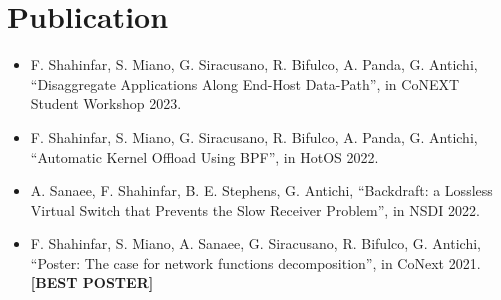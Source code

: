 \section {Publication}
\begin{itemize}
  \item F. Shahinfar, S. Miano, G. Siracusano, R. Bifulco, A. Panda, G. Antichi, ``Disaggregate Applications Along End-Host Data-Path'', in CoNEXT Student Workshop 2023.
    \item F. Shahinfar, S. Miano, G. Siracusano, R. Bifulco, A. Panda, G. Antichi, ``Automatic Kernel Offload Using BPF'', in HotOS 2022.
    \item A. Sanaee, F. Shahinfar, B. E. Stephens, G. Antichi, ``Backdraft: a Lossless Virtual Switch that
        Prevents the Slow Receiver Problem'', in NSDI 2022.

    \item F. Shahinfar, S. Miano, A. Sanaee, G. Siracusano, R. Bifulco, G. Antichi,
        ``Poster: The case for network functions decomposition'', in CoNext 2021. \textbf{[BEST POSTER]}
\end{itemize}


